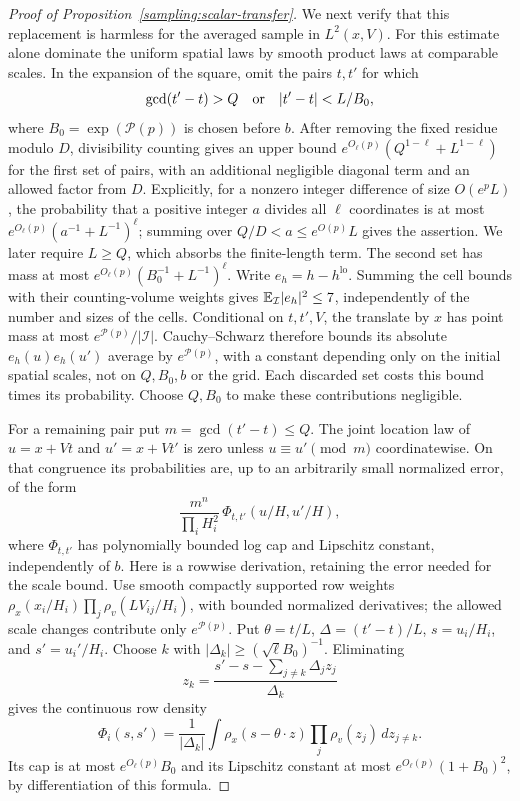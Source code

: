 \begin{proof}[Proof of Proposition~\ref{sampling:scalar-transfer}]
We next verify that this replacement is harmless for the averaged sample
in $L^2(x,V)$.  For this estimate alone dominate the uniform spatial laws
by smooth product laws at comparable scales.  In the expansion of the
square, omit the pairs $t,t'$ for which
\[
 \gcd(t'-t)>Q\quad\hbox{or}\quad
 |t'-t|<L/B_0,
\]
where $B_0=\exp(\mathcal P(p))$ is chosen before $b$.
After removing the fixed residue modulo $D$, divisibility counting gives
an upper bound $e^{O_\ell(p)}(Q^{1-\ell}+L^{1-\ell})$ for the first set of pairs,
with an additional negligible diagonal term and an allowed factor from
$D$.  Explicitly, for a nonzero integer difference of size $O(e^pL)$,
the probability that a positive integer $a$ divides all $\ell$ coordinates
is at most $e^{O_\ell(p)}(a^{-1}+L^{-1})^\ell$; summing over
$Q/D<a\le e^{O(p)}L$ gives the assertion.  We later require $L\ge Q$,
which absorbs the finite-length term.  The second set has mass at most
$e^{O_\ell(p)}(B_0^{-1}+L^{-1})^\ell$.
Write $e_h=h-h^{\mathrm{lo}}$.  Summing the cell bounds with their
counting-volume weights gives $\mathbb E_{\mathcal I}|e_h|^2\le7$,
independently of the number and sizes of the cells.  Conditional on
$t,t',V$, the translate by $x$ has point mass at most
$e^{\mathcal P(p)}/|\mathcal I|$.  Cauchy--Schwarz therefore bounds its
absolute $e_h(u)e_h(u')$ average by $e^{\mathcal P(p)}$, with a constant
depending only on the initial spatial scales, not on $Q,B_0,b$ or the
grid.  Each discarded set costs this bound times its probability.
Choose $Q,B_0$ to make these contributions negligible.

For a remaining pair put $m=\gcd(t'-t)\le Q$.
The joint location law of $u=x+Vt$ and $u'=x+Vt'$ is zero unless
$u\equiv u'\pmod m$ coordinatewise.  On that congruence its probabilities
are, up to an arbitrarily small normalized error, of the form
\begin{equation}\label{sampling:fiber-density}
 \frac{m^n}{\prod_iH_i^2}\,
 \Phi_{t,t'}(u/H,u'/H),
\end{equation}
where $\Phi_{t,t'}$ has polynomially bounded log cap and Lipschitz constant,
independently of $b$.  Here is a rowwise derivation, retaining the error
needed for the scale bound.  Use smooth compactly supported row weights
$\rho_x(x_i/H_i)\prod_j\rho_v(LV_{ij}/H_i)$, with bounded normalized
derivatives; the allowed scale changes contribute only $e^{\mathcal P(p)}$.
Put $\theta=t/L$, $\Delta=(t'-t)/L$, $s=u_i/H_i$, and $s'=u_i'/H_i$.
Choose $k$ with $|\Delta_k|\ge(\sqrt\ell B_0)^{-1}$.  Eliminating
\[
 z_k=\frac{s'-s-\sum_{j\ne k}\Delta_jz_j}{\Delta_k}
\]
gives the continuous row density
\[
 \Phi_i(s,s')=\frac1{|\Delta_k|}
 \int\rho_x(s-\theta\cdot z)\prod_j\rho_v(z_j)\,dz_{j\ne k}.
\]
Its cap is at most $e^{O_\ell(p)}B_0$ and its Lipschitz constant at most
$e^{O_\ell(p)}(1+B_0)^2$, by differentiation of this formula.


\end{proof}
